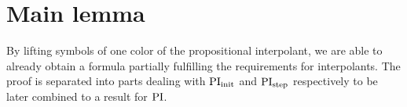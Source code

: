 \begin{comment}
	\begin{lemma}
		Let $s$ and $t$ be terms such that no $x_i$ occurs in them, $\Phi$ a set of formulas and $M$ a model.
		Then $M\entails \lft{\Phi}{x}{s} = \lft{\Phi}{x}{t}$ implies that $M\entails s=t$.
		\label{lemma:lift_equality}
	\end{lemma}
	\begin{proof}
		Suppose no $\Delta$-term occurs in $s$ or $t$. Then $\lft{\Phi}{x}{s} = s$ 
		and $\lft{\Phi}{x}{t} = t$.

		Otherwise let $t_i$ be a maximal $\Delta$-term in $s$. Suppose it occurs at position $p$. In $\lft{\Phi}{x}{s}$, it is replaced by $x_i$.
		But as $M \entails \lft{\Phi}{x}{s} = \lft{\Phi}{x}{t}$, two situations can arise:
		\begin{compactenum}
		\item $x_i$ occurs at $p$ in $\lft{\Phi}{x}{t}$.
			As $x_i$ does not occur in $t$, it is placed there by the lifting.
			But $x_i$ is only employed in order to replace $t_i$, so at position $p$ in $t$, we have $t_i$.
		\item A term $r$ occurs at $p$ in $\lft{\Phi}{x}{t}$ which does not influence the evaluation of $\lft{\Phi}{x}{t}$ in $M$. This can be the case if $r$ is contained in a subterm of $u$ and in $M$, the function symbol of $u$ is interpreted such that it does not depend on the argument that contains $r$.

			But as the maximal $\Delta$-term $t_i$ occurs in $s$ at $p$ and $M \entails \lft{\Phi}{x}{s} = \lft{\Phi}{x}{t}$, there is a function symbol $u'$ in $\lft{\Phi}{x}{s}$ corresponding to $u$ which also does not depend on this argument.

			Hence even though $s$ and $t$ are not syntactically equal, $M\entails s=t$ in this case.\qedhere
		\end{compactenum}

	\end{proof}
\end{comment}



\section{Main lemma}
\label{sec:two_phase_main_lemma}

By lifting symbols of one color of the propositional interpolant, we are able to already obtain a formula partially fulfilling the requirements for interpolants.
The proof is separated into parts dealing with $\operatorname{PI}_{\mathrm{init}}$ and $\operatorname{PI}_{\mathrm{step}}$ respectively to be later combined to a result for\nolinebreak{} $\operatorname{PI}$.

